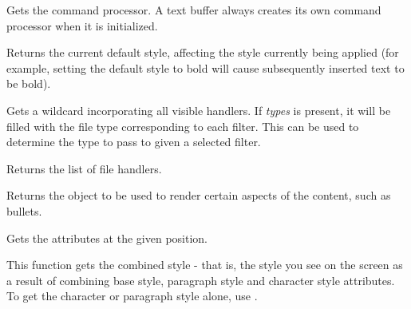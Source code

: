 \label{wxrichtextbuffergetcommandprocessor}


Gets the command processor. A text buffer always creates its own command processor when it is
initialized.

\label{wxrichtextbuffergetdefaultstyle}


Returns the current default style, affecting the style currently being applied (for example, setting the default
style to bold will cause subsequently inserted text to be bold).

\label{wxrichtextbuffergetextwildcard}


Gets a wildcard incorporating all visible handlers. If {\it types} is present,
it will be filled with the file type corresponding to each filter. This can be
used to determine the type to pass to  given a selected filter.

\label{wxrichtextbuffergethandlers}


Returns the list of file handlers.

\label{wxrichtextbuffergetrenderer}


Returns the object to be used to render certain aspects of the content, such as bullets.

\label{wxrichtextbuffergetstyle}


Gets the attributes at the given position.

This function gets the combined style - that is, the style you see on the screen as a result
of combining base style, paragraph style and character style attributes. To get the character
or paragraph style alone, use .

